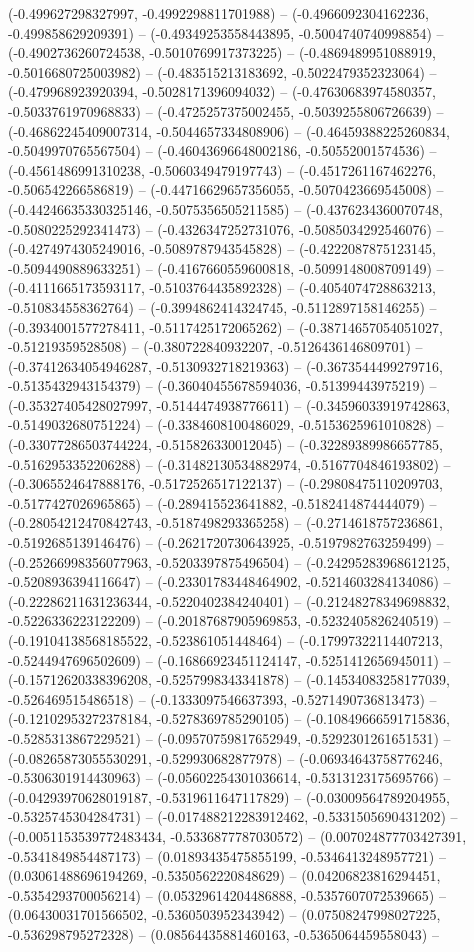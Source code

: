 (-0.499627298327997, -0.4992298811701988) -- (-0.4966092304162236, -0.499858629209391) -- (-0.49349253558443895, -0.5004740740998854) -- (-0.4902736260724538, -0.5010769917373225) -- (-0.4869489951088919, -0.5016680725003982) -- (-0.483515213183692, -0.5022479352323064) -- (-0.479968923920394, -0.5028171396094032) -- (-0.47630683974580357, -0.5033761970968833) -- (-0.4725257375002455, -0.5039255806726639) -- (-0.46862245409007314, -0.5044657334808906) -- (-0.46459388225260834, -0.5049970765567504) -- (-0.46043696648002186, -0.50552001574536) -- (-0.4561486991310238, -0.5060349479197743) -- (-0.4517261167462276, -0.506542266586819) -- (-0.44716629657356055, -0.5070423669545008) -- (-0.44246635330325146, -0.5075356505211585) -- (-0.4376234360070748, -0.5080225292341473) -- (-0.4326347252731076, -0.5085034292546076) -- (-0.4274974305249016, -0.5089787943545828) -- (-0.4222087875123145, -0.5094490889633251) -- (-0.4167660559600818, -0.5099148008709149) -- (-0.4111665173593117, -0.5103764435892328) -- (-0.4054074728863213, -0.510834558362764) -- (-0.3994862414324745, -0.5112897158146255) -- (-0.3934001577278411, -0.5117425172065262) -- (-0.38714657054051027, -0.51219359528508) -- (-0.380722840932207, -0.5126436146809701) -- (-0.37412634054946287, -0.5130932718219363) -- (-0.3673544499279716, -0.5135432943154379) -- (-0.36040455678594036, -0.51399443975219) -- (-0.35327405428027997, -0.5144474938776611) -- (-0.34596033919742863, -0.5149032680751224) -- (-0.3384608100486029, -0.5153625961010828) -- (-0.33077286503744224, -0.515826330012045) -- (-0.32289389986657785, -0.5162953352206288) -- (-0.31482130534882974, -0.5167704846193802) -- (-0.3065524647888176, -0.5172526517122137) -- (-0.29808475110209703, -0.5177427026965865) -- (-0.289415523641882, -0.5182414874444079) -- (-0.28054212470842743, -0.5187498293365258) -- (-0.2714618757236861, -0.5192685139146476) -- (-0.2621720730643925, -0.5197982763259499) -- (-0.25266998356077963, -0.5203397875496504) -- (-0.24295283968612125, -0.5208936394116647) -- (-0.23301783448464902, -0.5214603284134086) -- (-0.22286211631236344, -0.5220402384240401) -- (-0.21248278349698832, -0.5226336223122209) -- (-0.20187687905969853, -0.5232405826240519) -- (-0.19104138568185522, -0.523861051448464) -- (-0.17997322114407213, -0.5244947696502609) -- (-0.16866923451124147, -0.5251412656945011) -- (-0.15712620338396208, -0.5257998343341878) -- (-0.14534083258177039, -0.526469515486518) -- (-0.1333097546637393, -0.5271490736813473) -- (-0.12102953272378184, -0.5278369785290105) -- (-0.10849666591715836, -0.5285313867229521) -- (-0.09570759817652949, -0.5292301261651531) -- (-0.08265873055530291, -0.529930682877978) -- (-0.06934643758776246, -0.5306301914430963) -- (-0.05602254301036614, -0.5313123175695766) -- (-0.04293970628019187, -0.5319611647117829) -- (-0.03009564789204955, -0.5325745304284731) -- (-0.017488212283912462, -0.5331505690431202) -- (-0.0051153539772483434, -0.5336877787030572) -- (0.007024877703427391, -0.5341849854487173) -- (0.01893435475855199, -0.5346413248957721) -- (0.03061488696194269, -0.5350562220848629) -- (0.04206823816294451, -0.5354293700056214) -- (0.05329614204486888, -0.5357607072539665) -- (0.06430031701566502, -0.5360503952343942) -- (0.07508247998027225, -0.536298795272328) -- (0.08564435881460163, -0.5365064459558043) -- 